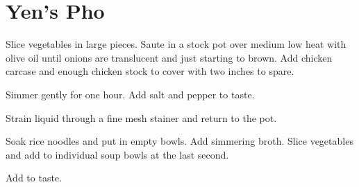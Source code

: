 

\section{Yen's Pho}
\begin{recipe}


Slice vegetables in large pieces. Saute in a stock pot over medium low heat with olive oil until onions are translucent and just starting to brown. Add chicken carcase and enough chicken stock to cover with two inches to spare.

Simmer gently for one hour. Add salt and pepper to taste.

Strain liquid through a fine mesh stainer and return to the pot.


Soak rice noodles and put in empty bowls. Add simmering broth. Slice vegetables and add to individual soup bowls at the last second.


Add to taste.


\end{recipe}
